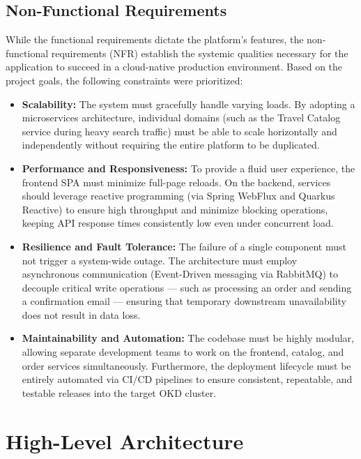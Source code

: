 \clearpage
\subsection{Non-Functional Requirements}

While the functional requirements dictate the platform's features, the non-functional requirements (\gls{NFR}) establish the systemic qualities necessary for the application to succeed in a cloud-native production environment. Based on the project goals, the following constraints were prioritized:

\begin{itemize}
    \item \textbf{Scalability:} The system must gracefully handle varying loads. By adopting a microservices architecture, individual domains (such as the Travel Catalog service during heavy search traffic) must be able to scale horizontally and independently without requiring the entire platform to be duplicated.
    \item \textbf{Performance and Responsiveness:} To provide a fluid user experience, the frontend \gls{SPA} must minimize full-page reloads. On the backend, services should leverage reactive programming (via Spring WebFlux and Quarkus Reactive) to ensure high throughput and minimize blocking operations, keeping API response times consistently low even under concurrent load.
    \item \textbf{Resilience and Fault Tolerance:} The failure of a single component must not trigger a system-wide outage. The architecture must employ asynchronous communication (Event-Driven messaging via RabbitMQ) to decouple critical write operations — such as processing an order and sending a confirmation email — ensuring that temporary downstream unavailability does not result in data loss.
    \item \textbf{Maintainability and Automation:} The codebase must be highly modular, allowing separate development teams to work on the frontend, catalog, and order services simultaneously. Furthermore, the deployment lifecycle must be entirely automated via CI/CD pipelines to ensure consistent, repeatable, and testable releases into the target OKD cluster.
\end{itemize}


\section{High-Level Architecture}
\label{sec:high_level_architecture}

